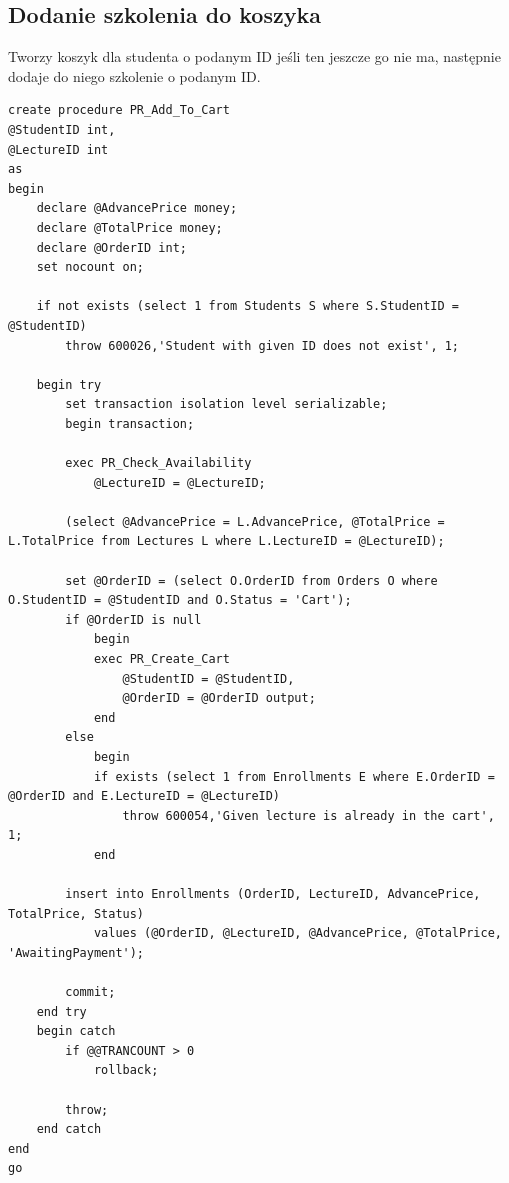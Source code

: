 \documentclass[11pt,a4paper]{article}
\begin{document}
\subsection{Dodanie szkolenia do koszyka}
Tworzy koszyk dla studenta o podanym ID jeśli ten jeszcze go nie ma, następnie dodaje do niego szkolenie o podanym ID.
\begin{Verbatim}[breaklines=true]
create procedure PR_Add_To_Cart
@StudentID int,
@LectureID int
as
begin
    declare @AdvancePrice money;
    declare @TotalPrice money;
    declare @OrderID int;
    set nocount on;

    if not exists (select 1 from Students S where S.StudentID = @StudentID)
        throw 600026,'Student with given ID does not exist', 1;
    
    begin try
        set transaction isolation level serializable;
        begin transaction;

        exec PR_Check_Availability
            @LectureID = @LectureID;

        (select @AdvancePrice = L.AdvancePrice, @TotalPrice = L.TotalPrice from Lectures L where L.LectureID = @LectureID);

        set @OrderID = (select O.OrderID from Orders O where O.StudentID = @StudentID and O.Status = 'Cart');
        if @OrderID is null
            begin
            exec PR_Create_Cart
                @StudentID = @StudentID,
                @OrderID = @OrderID output;
            end
        else 
            begin
            if exists (select 1 from Enrollments E where E.OrderID = @OrderID and E.LectureID = @LectureID)
                throw 600054,'Given lecture is already in the cart', 1;
            end

        insert into Enrollments (OrderID, LectureID, AdvancePrice, TotalPrice, Status)
            values (@OrderID, @LectureID, @AdvancePrice, @TotalPrice, 'AwaitingPayment');

        commit;
    end try
    begin catch
        if @@TRANCOUNT > 0
            rollback;

        throw;
    end catch
end
go
\end{Verbatim}
\end{document}
